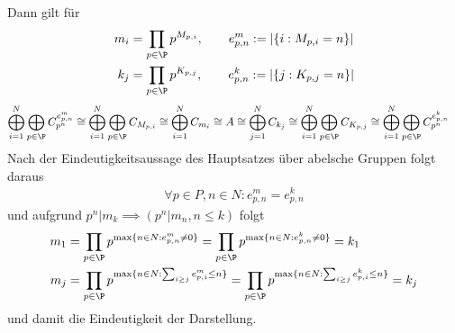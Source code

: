 \begin{solution}
Dann gilt für
\begin{align*}
  m_i &= \prod_{p \in \P}p^{M_{p,i}}, \qquad e^m_{p,n} := |\{i: M_{p,i} = n\}| \\
  k_j &= \prod_{p \in \P} p^{K_{p,j}}, \qquad e^k_{p,n} := |\{j: K_{p,j} = n\}|
\end{align*}
\begin{align*}
\bigoplus_{i = 1}^{N}\bigoplus_{p \in \P}C_{p^n}^{e^m_{p,n}} &\cong
\bigoplus_{i = 1}^{N}\bigoplus_{p \in \P}C_{M_{p,i}} \cong
\bigoplus_{i = 1}^{N} C_{m_i} \cong A \cong \bigoplus_{j = 1}^{N} C_{k_j}
\cong \bigoplus_{i = 1}^{N}\bigoplus_{p \in \P}C_{K_{p,j}}
\cong \bigoplus_{i = 1}^{N}\bigoplus_{p \in \P}C_{p^n}^{e^k_{p,n}}
\end{align*}
Nach der Eindeutigkeitsaussage des Hauptsatzes über abelsche Gruppen folgt daraus
\begin{align*}
  \forall p \in P, n \in N: e^m_{p,n} = e^k_{p,n}
\end{align*}
und aufgrund $p^n | m_k \implies (p^n | m_n, n \leq k)$ folgt
\begin{align*}
  m_1 &= \prod_{p \in \P}p^{\max\{n \in N: e^m_{p,n} \neq 0\}}
  = \prod_{p \in \P}p^{\max\{n \in N: e^k_{p,n} \neq 0\}} = k_1 \\
  m_j &= \prod_{p \in \P}p^{\max\{n \in N: \sum_{i \geq j}e^m_{p,i} \leq n\}}
  = \prod_{p \in \P}p^{\max\{n \in N: \sum_{i \geq j}e^k_{p,i} \leq n\}} = k_j
\end{align*}
und damit die Eindeutigkeit der Darstellung.
\end{solution}
